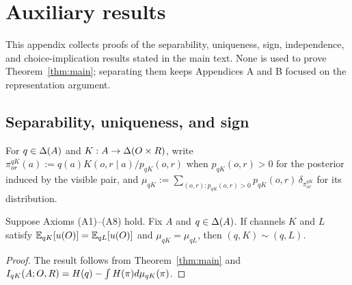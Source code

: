 \section{Auxiliary results}\label{app:auxiliary-results}

This appendix collects proofs of the separability, uniqueness, sign, independence, and
choice-implication results stated in the main text.  None is used to prove
Theorem~\ref{thm:main}; separating them keeps Appendices A and B focused on
the representation argument.

\subsection{Separability, uniqueness, and sign}

For $q\in\Delta(A)$ and $K:A\to\Delta(O\times R)$, write $\pi^{qK}_{or}(a):=q(a)K(o,r\mid a)/p_{qK}(o,r)$ when
$p_{qK}(o,r)>0$ for the posterior induced by the visible pair, and
$\mu_{qK}:=\sum_{(o,r):p_{qK}(o,r)>0}p_{qK}(o,r)\,\delta_{\pi^{qK}_{or}}$ for its distribution.

\begin{corollary}\label{cor:matching}
Suppose Axioms \textup{(A1)--(A8)} hold.  Fix $A$ and $q\in\Delta(A)$.  If channels $K$ and $L$ satisfy
$\mathbb E_{qK}[u(O)]=\mathbb E_{qL}[u(O)]$ and $\mu_{qK}=\mu_{qL}$, then $(q,K)\sim(q,L)$.
\end{corollary}

\begin{proof}
The result follows from Theorem~\ref{thm:main} and
$I_{qK}(A;O,R)=H(q)-\int H(\pi)d\mu_{qK}(\pi)$.
\end{proof}

